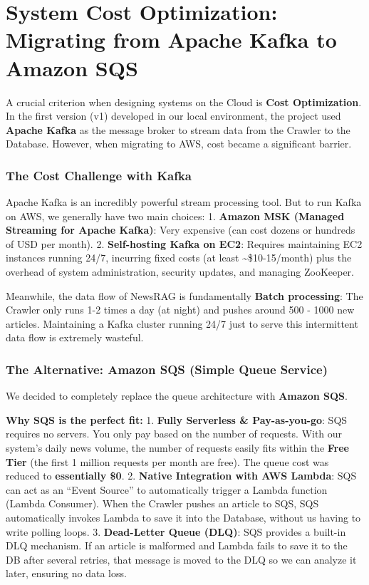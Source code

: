 \hypertarget{system-cost-optimization-migrating-from-apache-kafka-to-amazon-sqs}{%
\section{System Cost Optimization: Migrating from Apache Kafka to Amazon
SQS}}

A crucial criterion when designing systems on the Cloud is \textbf{Cost
Optimization}. In the first version (v1) developed in our local
environment, the project used \textbf{Apache Kafka} as the message
broker to stream data from the Crawler to the Database. However, when
migrating to AWS, cost became a significant barrier.

\hypertarget{the-cost-challenge-with-kafka}{%
\subsubsection{The Cost Challenge with
Kafka}}

Apache Kafka is an incredibly powerful stream processing tool. But to
run Kafka on AWS, we generally have two main choices: 1. \textbf{Amazon
MSK (Managed Streaming for Apache Kafka)}: Very expensive (can cost
dozens or hundreds of USD per month). 2. \textbf{Self-hosting Kafka on
EC2}: Requires maintaining EC2 instances running 24/7, incurring fixed
costs (at least \textasciitilde\$10-15/month) plus the overhead of
system administration, security updates, and managing ZooKeeper.

Meanwhile, the data flow of NewsRAG is fundamentally \textbf{Batch
processing}: The Crawler only runs 1-2 times a day (at night) and pushes
around 500 - 1000 new articles. Maintaining a Kafka cluster running 24/7
just to serve this intermittent data flow is extremely wasteful.

\hypertarget{the-alternative-amazon-sqs-simple-queue-service}{%
\subsubsection{The Alternative: Amazon SQS (Simple Queue
Service)}}

We decided to completely replace the queue architecture with
\textbf{Amazon SQS}.

\textbf{Why SQS is the perfect fit:} 1. \textbf{Fully Serverless \&
Pay-as-you-go}: SQS requires no servers. You only pay based on the
number of requests. With our system's daily news volume, the number of
requests easily fits within the \textbf{Free Tier} (the first 1 million
requests per month are free). The queue cost was reduced to
\textbf{essentially \$0}. 2. \textbf{Native Integration with AWS
Lambda}: SQS can act as an ``Event Source'' to automatically trigger a
Lambda function (Lambda Consumer). When the Crawler pushes an article to
SQS, SQS automatically invokes Lambda to save it into the Database,
without us having to write polling loops. 3. \textbf{Dead-Letter Queue
(DLQ)}: SQS provides a built-in DLQ mechanism. If an article is
malformed and Lambda fails to save it to the DB after several retries,
that message is moved to the DLQ so we can analyze it later, ensuring no
data loss.

